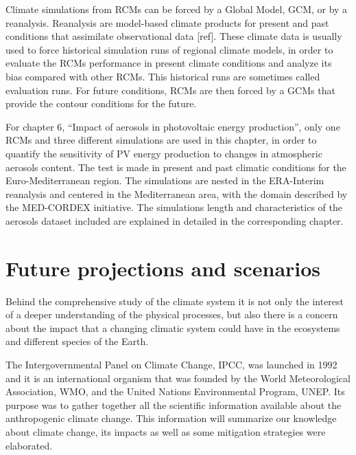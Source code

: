 Climate simulations from RCMs can be forced by a Global Model, GCM, or by a reanalysis. Reanalysis are model-based climate products for present and past conditions that assimilate observational data [ref]. These climate data is usually used to force historical simulation runs of regional climate models, in order to evaluate the RCMs performance in present climate conditions and analyze its bias compared with other RCMs. This historical runs are sometimes called evaluation runs. For future conditions, RCMs are then forced by a GCMs that provide the contour conditions for the future.  

For chapter 6, ``Impact of aerosols in photovoltaic energy production'', only one RCMs and three different simulations are used in this chapter, in order to quantify the sensitivity of PV energy production to changes in atmospheric aerosols content. The test is made in present and past climatic conditions for the Euro-Mediterranean region. The simulations are nested in the ERA-Interim reanalysis and centered in the Mediterranean area, with the domain described by the MED-CORDEX initiative. The simulations length and characteristics of the aerosols dataset included are explained in detailed in the corresponding chapter.



\section{Future projections and scenarios}

Behind the comprehensive study of the climate system it is not only the interest of a deeper understanding of the physical processes, but also there is a concern about the impact that a changing climatic system could have in the ecosystems and different species of the Earth.

The Intergovernmental Panel on Climate Change, IPCC, was launched in 1992 and it is an international organism that was founded by the World Meteorological Association, WMO, and the United Nations Environmental Program, UNEP. Its purpose was to gather together all the scientific information available about the anthropogenic climate change. This information will summarize our knowledge about climate change, its impacts as well as some mitigation strategies were elaborated.

